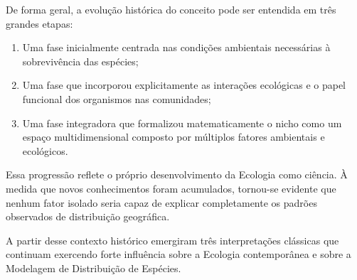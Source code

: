 De forma geral, a evolução histórica do conceito pode ser entendida em três grandes etapas:

\begin{enumerate}
	
	\item Uma fase inicialmente centrada nas condições ambientais necessárias à sobrevivência das espécies;
	
	\item Uma fase que incorporou explicitamente as interações ecológicas e o papel funcional dos organismos nas comunidades;
	
	\item Uma fase integradora que formalizou matematicamente o nicho como um espaço multidimensional composto por múltiplos fatores ambientais e ecológicos.
	
\end{enumerate}

Essa progressão reflete o próprio desenvolvimento da Ecologia como ciência. À medida que novos conhecimentos foram acumulados, tornou-se evidente que nenhum fator isolado seria capaz de explicar completamente os padrões observados de distribuição geográfica.

A partir desse contexto histórico emergiram três interpretações clássicas que continuam exercendo forte influência sobre a Ecologia contemporânea e sobre a Modelagem de Distribuição de Espécies.

